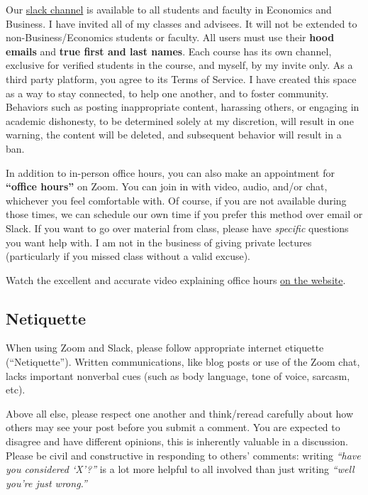 \documentclass{article}
\begin{document}
Our \href{https://hoodcollegeeconomics.slack.com}{slack channel} is
available to all students and faculty in Economics and Business. I have
invited all of my classes and advisees. It will not be extended to
non-Business/Economics students or faculty. All users must use their
\textbf{hood emails} and \textbf{true first and last names}. Each course
has its own channel, exclusive for verified students in the course, and
myself, by my invite only. As a third party platform, you agree to its
Terms of Service. I have created this space as a way to stay connected,
to help one another, and to foster community. Behaviors such as posting
inappropriate content, harassing others, or engaging in academic
dishonesty, to be determined solely at my discretion, will result in one
warning, the content will be deleted, and subsequent behavior will
result in a ban.

In addition to in-person office hours, you can also make an appointment
for \textbf{``office hours''} on Zoom. You can join in with video,
audio, and/or chat, whichever you feel comfortable with. Of course, if
you are not available during those times, we can schedule our own time
if you prefer this method over email or Slack. If you want to go over
material from class, please have \emph{specific} questions you want help
with. I am not in the business of giving private lectures (particularly
if you missed class without a valid excuse).

Watch the excellent and accurate video explaining office hours
\href{https://gamef21.classes.ryansafner.com/syllabus/\#communication-email-slack-and-virtual-office-hours}{on
the website}.

\hypertarget{netiquette}{%
\subsection{Netiquette}\label{netiquette}}

When using Zoom and Slack, please follow appropriate internet etiquette
(``Netiquette''). Written communications, like blog posts or use of the
Zoom chat, lacks important nonverbal cues (such as body language, tone
of voice, sarcasm, etc).

Above all else, please respect one another and think/reread carefully
about how others may see your post before you submit a comment. You are
expected to disagree and have different opinions, this is inherently
valuable in a discussion. Please be civil and constructive in responding
to others' comments: writing \emph{``have you considered `X'?''} is a
lot more helpful to all involved than just writing \emph{``well you're
just wrong.''}
\end{document}
